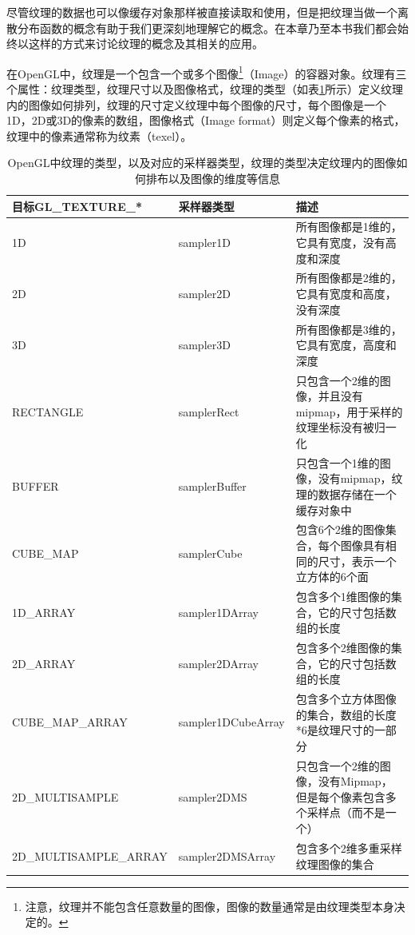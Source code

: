 尽管纹理的数据也可以像缓存对象那样被直接读取和使用，但是把纹理当做一个离散分布函数的概念有助于我们更深刻地理解它的概念。在本章乃至本书我们都会始终以这样的方式来讨论纹理的概念及其相关的应用。

在OpenGL中，纹理是一个包含一个或多个图像\footnote{注意，纹理并不能包含任意数量的图像，图像的数量通常是由纹理类型本身决定的。}（Image）的容器对象。纹理有三个属性：纹理类型，纹理尺寸以及图像格式，纹理的类型（如表\ref{t:api-texture-type}所示）定义纹理内的图像如何排列，纹理的尺寸定义纹理中每个图像的尺寸，每个图像是一个1D，2D或3D的像素的数组，图像格式（Image format）则定义每个像素的格式，纹理中的像素通常称为纹素（texel）。

\begin{table}
\begin{fullwidth}
\caption{OpenGL中纹理的类型，以及对应的采样器类型，纹理的类型决定纹理内的图像如何排布以及图像的维度等信息}
\label{t:api-texture-type}
\centering
\begin{tabular}{>{\footnotesize}p{0.27\thewidth}|>{\small}p{0.19\thewidth}|>{\small}p{0.52\thewidth}}
\hline 
   目标GL\_TEXTURE\_* & 采样器类型 & 描述 \\
    \hline  
  1D  &sampler1D &所有图像都是1维的，它具有宽度，没有高度和深度\\
  2D  &sampler2D &所有图像都是2维的，它具有宽度和高度，没有深度\\
  3D  &sampler3D &所有图像都是3维的，它具有宽度，高度和深度\\
  RECTANGLE  &samplerRect &只包含一个2维的图像，并且没有mipmap，用于采样的纹理坐标没有被归一化\\
  BUFFER  &samplerBuffer & 只包含一个1维的图像，没有mipmap，纹理的数据存储在一个缓存对象中\\
  CUBE\_MAP &samplerCube& 包含6个2维的图像集合，每个图像具有相同的尺寸，表示一个立方体的6个面\\
  1D\_ARRAY &sampler1DArray& 包含多个1维图像的集合，它的尺寸包括数组的长度\\
  2D\_ARRAY &sampler2DArray& 包含多个2维图像的集合，它的尺寸包括数组的长度\\
  CUBE\_MAP\_ARRAY &sampler1DCubeArray& 包含多个立方体图像的集合，数组的长度*6是纹理尺寸的一部分\\
  2D\_MULTISAMPLE &sampler2DMS& 只包含一个2维的图像，没有Mipmap，但是每个像素包含多个采样点（而不是一个）\\
  2D\_MULTISAMPLE\_ARRAY &sampler2DMSArray&包含多个2维多重采样纹理图像的集合\\

 \hline 
\end{tabular}
\end{fullwidth}
\end{table}




